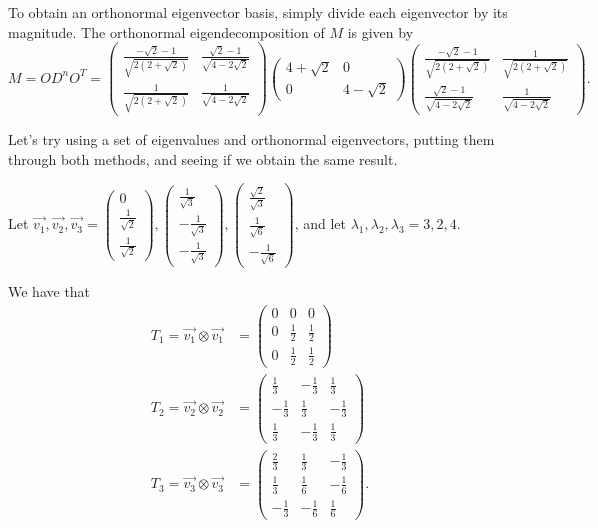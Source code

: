 \documentclass[a4paper, 12pt,oneside,openany]{book}
\begin{document}
To obtain an orthonormal eigenvector basis, simply divide each eigenvector by its magnitude. The orthonormal eigendecomposition of $M$ is given by $$M = OD^nO^T = \begin{pmatrix} \frac{-\sqrt{2}-1}{\sqrt{2(2+\sqrt{2})}} & \frac{\sqrt{2}-1}{\sqrt{4-2\sqrt{2}}}\\ \frac{1}{\sqrt{2(2+\sqrt{2})}} & \frac{1}{\sqrt{4-2\sqrt{2}}}\end{pmatrix} \begin{pmatrix} 4+\sqrt{2} & 0 \\ 0 & 4-\sqrt{2} \end{pmatrix} \begin{pmatrix} \frac{-\sqrt{2}-1}{\sqrt{2(2+\sqrt{2})}} & \frac{1}{\sqrt{2(2+\sqrt{2})}} \\ \frac{\sqrt{2}-1}{\sqrt{4-2\sqrt{2}}}  & \frac{1}{\sqrt{4-2\sqrt{2}}}\end{pmatrix}.$$

Let's try using a set of eigenvalues and orthonormal eigenvectors, putting them through both methods, and seeing if we obtain the same result. 

 Let $\vec{v_1}, \vec{v_2}, \vec{v_3} = \begin{pmatrix} 0 \\ \frac{1}{\sqrt{2}} \\ \frac{1}{\sqrt{2}} \end{pmatrix}, \begin{pmatrix} \frac{1}{\sqrt{3}} \\ -\frac{1}{\sqrt{3}} \\ -\frac{1}{\sqrt{3}} \end{pmatrix}, \begin{pmatrix} \frac{\sqrt{2}}{\sqrt{3}} \\ \frac{1}{\sqrt{6}} \\ -\frac{1}{\sqrt{6}} \end{pmatrix}$, and let $\lambda_1, \lambda_2, \lambda_3 = 3, 2, 4.$ 

We have that \begin{align*}T_1=\vec{v_1} \otimes \vec{v_1} &= \begin{pmatrix} 0&0&0 \\ 0&\frac{1}{2}&\frac{1}{2} \\ 0&\frac{1}{2}&\frac{1}{2} \end{pmatrix} \\ T_2=\vec{v_2} \otimes \vec{v_2} &= \begin{pmatrix} \frac{1}{3}&-\frac{1}{3}&\frac{1}{3} \\ -\frac{1}{3}&\frac{1}{3}&-\frac{1}{3} \\ \frac{1}{3}&-\frac{1}{3}&\frac{1}{3} \end{pmatrix} \\ T_3=\vec{v_3} \otimes \vec{v_3} &= \begin{pmatrix}\frac{2}{3}&\frac{1}{3}&-\frac{1}{3} \\ \frac{1}{3}&\frac{1}{6}&-\frac{1}{6} \\ -\frac{1}{3}&-\frac{1}{6}&\frac{1}{6} \end{pmatrix}. \end{align*}
\end{document}
